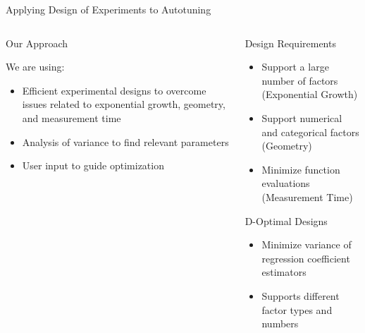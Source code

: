 \documentclass[10pt, compress, aspectratio=169, xcolor={table,usenames,dvipsnames}]{beamer}
\begin{document}
\begin{frame}[label={sec:orgfd55714}]{Applying Design of Experiments to Autotuning}
\begin{columns}
\begin{column}{0.5\columnwidth}
\begin{block}{Our Approach}
\vspace{.2cm}

We are using:

\begin{itemize}
\item \alert{Efficient experimental designs} to overcome issues related to \alert{exponential growth}, \alert{geometry}, and \alert{measurement time}
\item \alert{Analysis of variance} to find \alert{relevant parameters}
\item \alert{User input} to guide optimization
\end{itemize}

\vspace{2cm}
\end{block}
\end{column}

\begin{column}{0.5\columnwidth}
\begin{block}{Design Requirements}
\begin{itemize}
\item Support a large number of factors (\alert{Exponential Growth})
\item Support numerical and categorical factors (\alert{Geometry})
\item Minimize function evaluations (\alert{Measurement Time})
\end{itemize}

\begin{block}{D-Optimal Designs}
\begin{itemize}
\item Minimize \alert{variance} of \alert{regression coefficient estimators}
\item Supports different factor \alert{types} and \alert{numbers}
\end{itemize}
\end{block}
\end{block}
\end{column}
\end{columns}
\end{frame}
\end{document}
